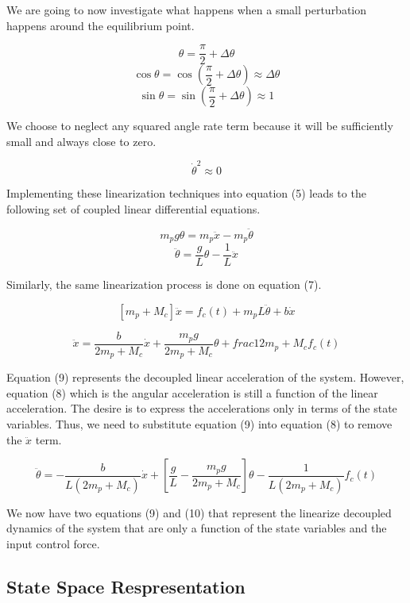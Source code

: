 \documentclass[titlepage]{article}
\begin{document}
We are going to now investigate what happens when a small perturbation happens around the equilibrium point.

\[\theta = \frac{\pi}{2} + \Delta\theta\]
\[\cos{\theta} = \cos{\left(\frac{\pi}{2} + \Delta\theta\right)} \approx \Delta\theta\]
\[\sin{\theta} = \sin{\left(\frac{\pi}{2} + \Delta\theta\right)} \approx 1\]

We choose to neglect any squared angle rate term because it will be sufficiently small and always close to zero.

\[\dot{\theta}^{2} \approx 0\]

Implementing these linearization techniques into equation (5) leads to the following set of coupled linear differential equations.

\[m_{p}g\theta = m_{p}\ddot{x} - m_{p}\ddot{\theta}\]
\begin{equation}
\ddot{\theta} = \frac{g}{L}\theta - \frac{1}{L}\ddot{x}
\end{equation}

Similarly, the same linearization process is done on equation (7).

\[\left[m_{p} + M_{c}\right] \ddot{x} = f_{c}\left(t\right) + m_{p}L\ddot{\theta} + b\dot{x}\]

\begin{equation}
\ddot{x} = \frac{b}{2m_{p} + M_{c}}\dot{x} + \frac{m_{p}g}{2m_{p} + M_{c}}\theta + frac{1}{2m_{p} + M_{c}}f_{c}\left(t\right)
\end{equation}

Equation (9) represents the decoupled linear acceleration of the system. However, equation (8) which is the angular acceleration is still a function of the linear acceleration.
The desire is to express the accelerations only in terms of the state variables. Thus, we need to substitute equation (9) into equation (8) to remove the \(\ddot{x}\) term.

\begin{equation}
\ddot{\theta} = -\frac{b}{L\left(2m_{p} + M_{c}\right)}\dot{x} + \left[\frac{g}{L} - \frac{m_{p}g}{2m_{p} + M_{c}}\right]\theta - \frac{1}{L\left(2m_{p} + M_{c}\right)}f_{c}\left(t\right)
\end{equation}

We now have two equations (9) and (10) that represent the linearize decoupled dynamics of the system that are only a function of the state variables and the input control force.

\subsection{State Space Respresentation}
\end{document}
